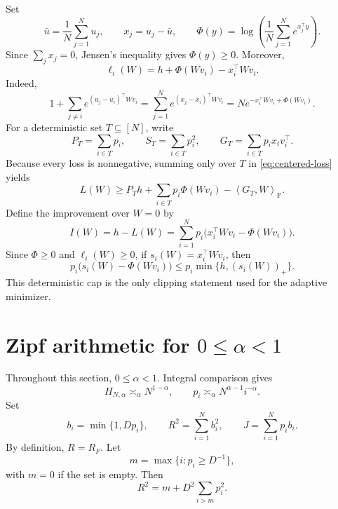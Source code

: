 \documentclass[11pt]{article}
\theoremstyle{remark}
\newcommand{\ip}[2]{\left\langle #1,#2\right\rangle}
\newcommand{\F}{\mathrm{F}}
\newcommand{\1}{\mathbf 1}
\begin{document}
Set
\[
 \bar u=\frac1N\sum_{j=1}^N u_j,
 \qquad
 x_j=u_j-\bar u,
 \qquad
 \Phi(y)=\log\!\left(\frac1N\sum_{j=1}^N e^{x_j^\top y}\right).
\]
Since $\sum_jx_j=0$, Jensen's inequality gives $\Phi(y)\geq0$.  Moreover,
\begin{equation}
 \ell_i(W)=h+\Phi(Wv_i)-x_i^\top Wv_i.
 \label{eq:centered-loss}
\end{equation}
Indeed,
\[
 1+\sum_{j\neq i}e^{(u_j-u_i)^\top Wv_i}
 =\sum_{j=1}^Ne^{(x_j-x_i)^\top Wv_i}
 =N e^{-x_i^\top Wv_i+\Phi(Wv_i)}.
\]
For a deterministic set $T\subseteq[N]$, write
\[
 P_T=\sum_{i\in T}p_i,
 \qquad
 S_T=\sum_{i\in T}p_i^2,
 \qquad
 G_T=\sum_{i\in T}p_i x_iv_i^\top.
\]
Because every loss is nonnegative, summing only over $T$ in
\eqref{eq:centered-loss} yields
\begin{equation}
 L(W)\geq P_T h+\sum_{i\in T}p_i\Phi(Wv_i)-\ip{G_T}{W}_{\F}.
 \label{eq:subset-lower}
\end{equation}
Define the improvement over $W=0$ by
\[
 I(W)=h-L(W)
 =\sum_{i=1}^Np_i\bigl(x_i^\top Wv_i-\Phi(Wv_i)\bigr).
\]
Since $\Phi\geq0$ and $\ell_i(W)\geq0$, if
$s_i(W)=x_i^\top Wv_i$, then
\begin{equation}
 p_i\bigl(s_i(W)-\Phi(Wv_i)\bigr)
 \leq p_i\min\{h,(s_i(W))_+\}.
 \label{eq:deterministic-cap}
\end{equation}
This deterministic cap is the only clipping statement used for the
adaptive minimizer.

\section{Zipf arithmetic for $0\leq\alpha<1$}

Throughout this section, $0\leq\alpha<1$.  Integral comparison gives
\begin{equation}
 H_{N,\alpha}\asymp_\alpha N^{1-\alpha},
 \qquad
 p_i\asymp_\alpha N^{\alpha-1}i^{-\alpha}.
 \label{eq:zipf-basic}
\end{equation}
Set
\begin{equation}
 b_i=\min\{1,Dp_i\},
 \qquad
 R^2=\sum_{i=1}^N b_i^2,
 \qquad
 J=\sum_{i=1}^Np_ib_i.
 \label{eq:bRJ}
\end{equation}
By definition, $R=R_F$.  Let
\[
 m=\max\{i:p_i\geq D^{-1}\},
\]
with $m=0$ if the set is empty.  Then
\begin{equation}
 R^2=m+D^2\sum_{i>m}p_i^2.
 \label{eq:R-decomp}
\end{equation}
\end{document}

